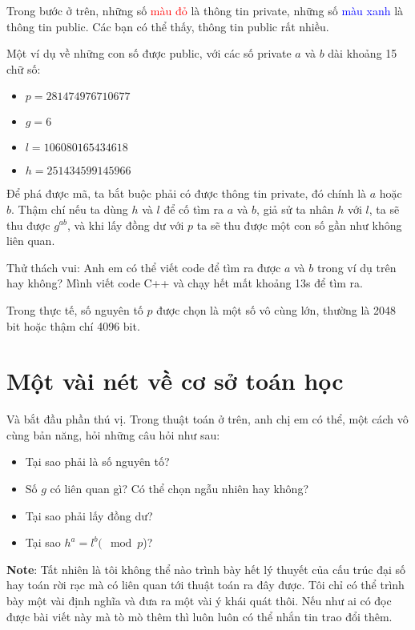 \documentclass[a4paper,12pt]{article}
\begin{document}
Trong bước ở trên, những số \textcolor{red}{màu đỏ} là thông tin private,
những số \textcolor{blue}{màu xanh} là thông tin public.
Các bạn có thể thấy, thông tin public rất nhiều.

Một ví dụ về những con số được public, với các số private $a$ và $b$ dài khoảng 15 chữ số:

\begin{itemize}
    \item $p = 281474976710677$
    \item $g = 6$
    \item $l = 106080165434618$
    \item $h = 251434599145966$
\end{itemize}

Để phá được mã, ta bắt buộc phải có được thông tin private, đó chính là $a$ hoặc $b$.
Thậm chí nếu ta dùng $h$ và $l$ để cố tìm ra $a$ và $b$, giả sử ta nhân $h$ với $l$,
ta sẽ thu được $g^{ab}$, và khi lấy đồng dư với $p$ ta sẽ thu được một con số gần như không liên quan.

Thử thách vui: Anh em có thể viết code để tìm ra được $a$ và $b$ trong ví dụ trên hay không?
Mình viết code C++ và chạy hết mất khoảng 13s để tìm ra.

Trong thực tế, số nguyên tố $p$ được chọn là một số vô cùng lớn, thường là 2048 bit hoặc
thậm chí 4096 bit.

\section{Một vài nét về cơ sở toán học}

Và bắt đầu phần thú vị. Trong thuật toán ở trên, anh chị em có thể, một cách vô cùng bản năng,
hỏi những câu hỏi như sau:

\begin{itemize}
    \item Tại sao phải là số nguyên tố?
    \item Số $g$ có liên quan gì? Có thể chọn ngẫu nhiên hay không?
    \item Tại sao phải lấy đồng dư?
    \item Tại sao $h^a = l^b (\mod p$)?
\end{itemize}

\textbf{Note}: Tất nhiên là tôi không thể nào trình bày hết lý thuyết của
cấu trúc đại số hay toán rời rạc mà có liên quan tới thuật toán ra đây được. Tôi chỉ có thể trình bày một vài định
nghĩa và đưa ra một vài ý khái quát thôi. Nếu như ai có đọc được bài viết này mà tò
mò thêm thì luôn luôn có thể nhắn tin trao đổi thêm.
\end{document}
